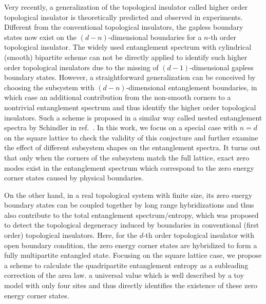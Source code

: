 \documentclass[doublecol]{epl2} %
\begin{document}
Very recently, a generalization of the topological insulator called higher order topological insulator is theoretically predicted and observed in experiments. \cite{Benalcazar_S_2017, Benalcazar_PRB_2017, Schindler_SA_2018, Song_PRL_2017, Parameswaran_P_2017, Xu_a_2017, Ezawa_PRL_2018, Ezawa_PRB_2018, Kunst_PRB_2018, Schindler_a_2018} Different from the conventional topological insulators, the gapless boundary states now exist on the $(d-n)$-dimensional boundaries for a $n$-th order topological insulator. The widely used entanglement spectrum with cylindrical (smooth) bipartite scheme can not be directly applied to identify such higher order topological insulators due to the missing of $(d-1)$-dimensional gapless boundary states. However, a straightforward generalization can be conceived by choosing the subsystem with $(d-n)$-dimensional  entanglement boundaries, in which case an additional contribution  from the non-smooth corners \cite{Laflorencie_PR_2016}  to a nontrivial entanglement spectrum and thus  identify the higher order topological insulators. Such a scheme is proposed in a similar way called nested entanglement spectra by Schindler \etal in ref.~\cite{Schindler_SA_2018}. In this work, we focus on a special case with $n=d$ on the square lattice to check the validity of this conjecture and further examine the effect of different subsystem shapes on the entanglement spectra. It turns out that only when the corners of the subsystem match the full lattice,
exact zero modes exist in the entanglement spectrum which correspond to the zero energy corner states caused by physical boundaries.

On the other hand, in a real topological system with finite size, its zero energy boundary states can be coupled together by long range hybridizations and thus also contribute to the total entanglement spectrum/entropy, which was proposed to detect the topological degeneracy induced by boundaries in conventional (first order) topological insulators. \cite{Wang_PRB_2015} Here, for the $d$-th order topological insulator with open boundary condition, the zero energy corner states are hybridized to form a fully multipartite entangled state. Focusing on the square lattice case, we propose a scheme to calculate the quadripartite entanglement entropy as a subleading correction of the area law.  a universal value which is well described by a toy model with only four sites and thus directly identifies the existence of these zero energy corner states. 
\end{document}

